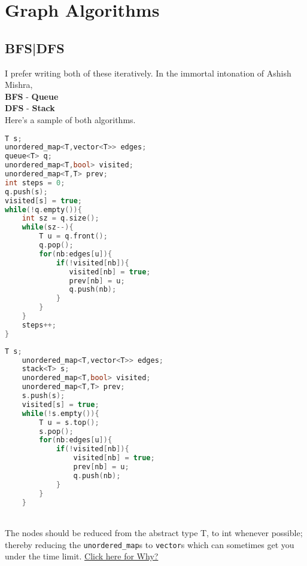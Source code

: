 \documentclass{article}
\begin{document}
\section{Graph Algorithms}
\subsection{BFS|DFS}
I prefer writing both of these iteratively. In the immortal
intonation of Ashish Mishra,\\
\textbf{BFS} - \textbf{Queue}\\
\textbf{DFS} - \textbf{Stack}\\
Here's a sample of both algorithms.\\
\noindent\begin{minipage}{.45\textwidth}
    \begin{lstlisting}[caption=BFS,language=C++]
T s;
unordered_map<T,vector<T>> edges;
queue<T> q;
unordered_map<T,bool> visited;
unordered_map<T,T> prev;
int steps = 0;
q.push(s);
visited[s] = true;
while(!q.empty()){
    int sz = q.size();
    while(sz--){
        T u = q.front();
        q.pop();
        for(nb:edges[u]){
            if(!visited[nb]){
               visited[nb] = true;
               prev[nb] = u;
               q.push(nb);
            }
        }
    }
    steps++;
}
        \end{lstlisting}
\end{minipage}\hfill
\begin{minipage}{.45\textwidth}
    \begin{lstlisting}[caption=DFS,language=C++]
    T s;
    unordered_map<T,vector<T>> edges;
    stack<T> s;
    unordered_map<T,bool> visited;
    unordered_map<T,T> prev;
    s.push(s);
    visited[s] = true;
    while(!s.empty()){
        T u = s.top();
        s.pop();
        for(nb:edges[u]){
            if(!visited[nb]){
                visited[nb] = true;
                prev[nb] = u;
                q.push(nb);
            }
        }
    }
    \end{lstlisting}
\end{minipage}\\
The nodes should be reduced from the abstract type T, to
int whenever possible; thereby reducing the
\texttt{unordered\_map}s to \texttt{vector}s which can
sometimes get you under the time limit.
\href{https://stackoverflow.com/questions/55451825/why-is-vector-faster-than-unordered-map}{Click here for Why?}
\end{document}
